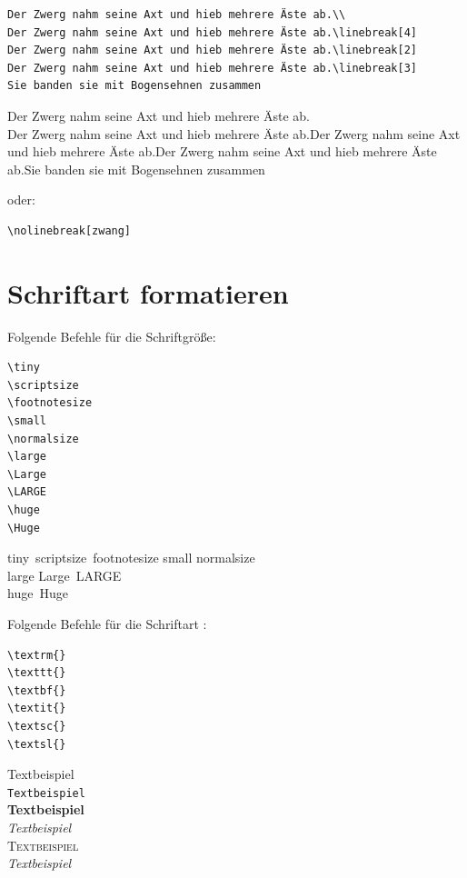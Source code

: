 \documentclass{like}
\begin{document}
\begin{verbatim}
Der Zwerg nahm seine Axt und hieb mehrere Äste ab.\\
Der Zwerg nahm seine Axt und hieb mehrere Äste ab.\linebreak[4]
Der Zwerg nahm seine Axt und hieb mehrere Äste ab.\linebreak[2]
Der Zwerg nahm seine Axt und hieb mehrere Äste ab.\linebreak[3]
Sie banden sie mit Bogensehnen zusammen
\end{verbatim}
Der Zwerg nahm seine Axt und hieb mehrere Äste ab.\\
Der Zwerg nahm seine Axt und hieb mehrere Äste ab.\linebreak[4]
Der Zwerg nahm seine Axt und hieb mehrere Äste ab.\linebreak[2]
Der Zwerg nahm seine Axt und hieb mehrere Äste ab.\linebreak[3]
Sie banden sie mit Bogensehnen zusammen
\par
oder:
\begin{verbatim}
\nolinebreak[zwang]
\end{verbatim}
\section{Schriftart formatieren}

Folgende Befehle für die Schriftgröße:\par\smallskip

\qquad\begin{minipage}{0.4\textwidth}
\vspace*{-0,3cm}
\begin{verbatim}
\tiny
\scriptsize
\footnotesize
\small
\normalsize
\large
\Large
\LARGE
\huge
\Huge
\end{verbatim}
\end{minipage}
\hspace*{0,8cm}
\begin{minipage}{0.4\textwidth}
\tiny tiny\,
\scriptsize scriptsize\,
\footnotesize footnotesize\;
\small small\;
\normalsize normalsize\\
\large large\;
\Large Large\
\LARGE LARGE\\
\huge huge\,
\Huge Huge\;
\end{minipage}\normalsize


Folgende Befehle für die Schriftart :

\qquad\begin{minipage}{0.2\textwidth}
\begin{verbatim}
\textrm{} 
\texttt{} 
\textbf{} 
\textit{} 
\textsc{} 
\textsl{} 
\end{verbatim}
\end{minipage}\quad
\begin{minipage}{0.4\textwidth}
\textrm{Textbeispiel} \\
\texttt{Textbeispiel} \\
\textbf{Textbeispiel} \\
\textit{Textbeispiel} \\
\textsc{Textbeispiel} \\
\textsl{Textbeispiel} 
\end{minipage}
\end{document}

